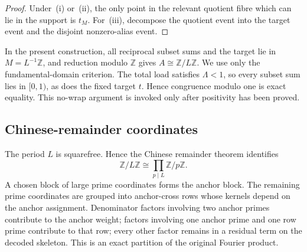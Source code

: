 \begin{proof}
Under~(i) or~(ii), the only point in the relevant quotient fibre which can lie in the support is $t_M$.  For~(iii), decompose the quotient event into the target event and the disjoint nonzero-alias event.
\end{proof}

In the present construction, all reciprocal subset sums and the target lie in $M=L^{-1}\mathbb Z$, and reduction modulo $\mathbb Z$ gives $A\cong\mathbb Z/L\mathbb Z$.  We use only the fundamental-domain criterion.  The total load satisfies $\Lambda<1$, so every subset sum lies in $[0,1)$, as does the fixed target $t$.  Hence congruence modulo one is exact equality.  This no-wrap argument is invoked only after positivity has been proved.

\subsection{Chinese-remainder coordinates}

The period $L$ is squarefree.  Hence the Chinese remainder theorem identifies
\[
 \mathbb Z/L\mathbb Z\cong\prod_{p\mid L}\mathbb Z/p\mathbb Z.
\]
A chosen block of large prime coordinates forms the anchor block.  The remaining prime coordinates are grouped into anchor-cross rows whose kernels depend on the anchor assignment.  Denominator factors involving two anchor primes contribute to the anchor weight; factors involving one anchor prime and one row prime contribute to that row; every other factor remains in a residual term on the decoded skeleton.  This is an exact partition of the original Fourier product.

